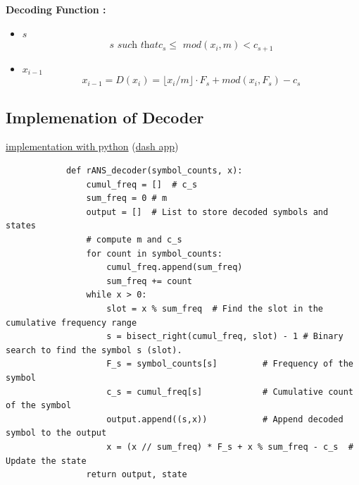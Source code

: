     \begin{frame}[fragile]{}
        \textbf{Decoding Function  :}
        \begin{itemize}
            \item $\mathit{s}$ $$ \mathit{s \text{ such that} c_s \leq \text{ mod} (x_i, m) < c_{s+1}} $$
            \item $\mathit{x_{i-1}}$ $$ \mathit{ x_{i-1} = D(x_i)= \lfloor x_i/m \rfloor \cdot F_s + \text{mod}(x_i, F_s) - c_s} $$
        \end{itemize}
    \end{frame}
    
    \subsection{Implemenation of Decoder}
    \begin{frame}[fragile]{}
        \href{http://localhost:8050}{implementation with python} (\href{https://github.com/hurryclear/cs_theory/tree/data_compression/24ws_data_compression/implementation}{dash app})
        \begin{verbatim}
            def rANS_decoder(symbol_counts, x):
                cumul_freq = []  # c_s
                sum_freq = 0 # m
                output = []  # List to store decoded symbols and states
                # compute m and c_s
                for count in symbol_counts:
                    cumul_freq.append(sum_freq)
                    sum_freq += count
                while x > 0:
                    slot = x % sum_freq  # Find the slot in the cumulative frequency range
                    s = bisect_right(cumul_freq, slot) - 1 # Binary search to find the symbol s (slot).
                    F_s = symbol_counts[s]         # Frequency of the symbol
                    c_s = cumul_freq[s]            # Cumulative count of the symbol
                    output.append((s,x))           # Append decoded symbol to the output
                    x = (x // sum_freq) * F_s + x % sum_freq - c_s  # Update the state
                return output, state
        \end{verbatim}
    \end{frame}

